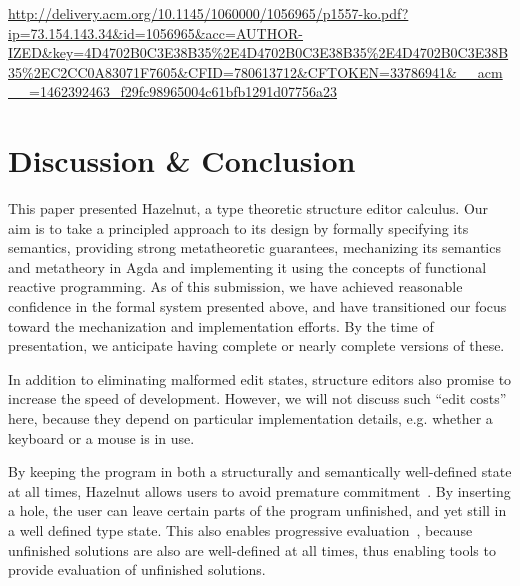 \documentclass[preprint,9pt]{sigplanconf}
\begin{document}
 \url{http://delivery.acm.org/10.1145/1060000/1056965/p1557-ko.pdf?ip=73.154.143.34&id=1056965&acc=AUTHOR-IZED&key=4D4702B0C3E38B35%2E4D4702B0C3E38B35%2E4D4702B0C3E38B35%2EC2CC0A83071F7605&CFID=780613712&CFTOKEN=33786941&__acm__=1462392463_f29fc98965004c61bfb1291d07756a23}

%
%



\section{Discussion \& Conclusion}
\label{sec:future}
This paper presented Hazelnut, a type theoretic structure editor calculus. Our aim is to take a principled approach to its design by formally specifying its semantics, providing strong metatheoretic guarantees, mechanizing its semantics and metatheory in Agda and implementing it using the concepts of  functional reactive programming. As of this submission, we have achieved reasonable confidence in the formal system presented above, and have transitioned our focus toward the mechanization and implementation efforts. By the time of presentation, we anticipate having complete or nearly complete versions of these.

In addition to eliminating malformed edit states, structure editors also promise to increase the speed of development. However, we will not discuss such ``edit costs'' here, because they depend on particular implementation details, e.g. whether a keyboard or a mouse is in use.

By keeping the program in both a structurally and semantically well-defined state at all times, Hazelnut allows users to avoid premature commitment~\cite{green1996usability}.  
By inserting a hole, the user can leave certain parts of the program unfinished,  and yet still in a well defined type state. 
This also enables progressive evaluation~\cite{green1996usability}, because unfinished solutions are also are well-defined at all times, thus enabling tools to provide evaluation of unfinished solutions. 
\end{document}
